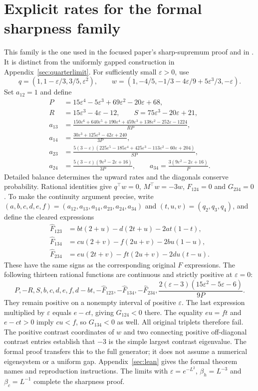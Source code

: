 \documentclass[11pt]{article}
\begin{document}
\section{Explicit rates for the formal sharpness family}\label{app:formalsharp}
This family is the one used in the focused paper's sharp-supremum proof
and in . It is distinct from the
uniformly gapped construction in Appendix~\ref{sec:quarterlimit}.
For sufficiently small $\varepsilon>0$, use
\[
q=(1,1-\varepsilon/3,3/5,\varepsilon^2),\qquad
w=(1,-4/5,-1/3-4\varepsilon/9+5\varepsilon^3/3,-\varepsilon).
\]
Set $a_{12}=1$ and define
\begin{align*}
P&=15\varepsilon^4-5\varepsilon^3+69\varepsilon^2-20\varepsilon+68,\\
R&=15\varepsilon^3-4\varepsilon-12,\qquad
S=75\varepsilon^3-20\varepsilon+21,\\
a_{13}&=\frac{150\varepsilon^6+640\varepsilon^5+190\varepsilon^4+
459\varepsilon^3+138\varepsilon^2-252\varepsilon-1224}{RP},\\
a_{14}&=\frac{30\varepsilon^3+125\varepsilon^2-42\varepsilon+240}{3P},\\
a_{23}&=\frac{5(3-\varepsilon)(225\varepsilon^5-185\varepsilon^4+
425\varepsilon^3-113\varepsilon^2-60\varepsilon+204)}{SP},\\
a_{24}&=\frac{5(3-\varepsilon)(9\varepsilon^2-2\varepsilon+16)}{3P},
\qquad a_{34}=\frac{3(9\varepsilon^2-2\varepsilon+16)}{P}.
\end{align*}
Detailed balance determines the upward rates and the diagonals conserve
probability. Rational identities give $q^\top w=0$, $M^\top w=-3w$,
$F_{124}=0$ and $G_{234}=0$. To make the continuity argument precise,
write $(a,b,c,d,e,f)=(a_{12},a_{13},a_{14},a_{23},a_{24},a_{34})$ and
$(t,u,v)=(q_2,q_3,q_4)$, and define the cleared expressions
\begin{align*}
\widehat F_{123}&=bt(2+u)-d(2t+u)-2at(1-t),\\
\widehat F_{134}&=cu(2+v)-f(2u+v)-2bu(1-u),\\
\widehat F_{234}&=eu(2t+v)-ft(2u+v)-2du(t-u).
\end{align*}
These have the same signs as the corresponding original $F$ expressions.
The following thirteen rational functions are continuous and strictly
positive at $\varepsilon=0$:
\[
P,-R,S,b,c,d,e,f,d-bt,-\widehat F_{123},-\widehat F_{134},
-\widehat F_{234},\frac{2(\varepsilon-3)(15\varepsilon^2-5\varepsilon-6)}{9P}.
\]
They remain positive on a nonempty interval of positive $\varepsilon$.
The last expression multiplied by $\varepsilon$ equals $e-ct$, giving
$G_{124}<0$ there. The equality $eu=ft$ and $e-ct>0$ imply $cu<f$,
so $G_{134}<0$ as well. All original triplets therefore fail.
The positive contrast coordinates of $w$ and two connecting positive
off-diagonal contrast entries establish that $-3$ is the simple largest
contrast eigenvalue. The formal proof transfers this to the full
generator; it does not assume a numerical eigensystem or a uniform gap.
Appendix~\ref{sec:lean} gives the formal theorem names and reproduction
instructions. The limits with $\varepsilon=e^{-L^2}$,
$\beta_h=L^{-3}$ and $\beta_c=L^{-1}$ complete the sharpness proof.
\end{document}
